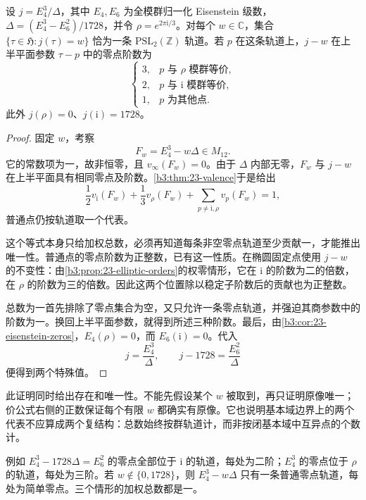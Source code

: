 \begin{theorem}\label{b3:thm:23-j-orbits}
设 \(j=E_4^3/\Delta\)，其中 \(E_4,E_6\) 为全模群归一化 Eisenstein 级数，\(\Delta=(E_4^3-E_6^2)/1728\)，并令 \(\rho=e^{2\pi\mathrm i/3}\)。对每个 \(w\in\mathbb C\)，集合
\(\{\tau\in\mathfrak H:j(\tau)=w\}\) 恰为一条 \(\mathrm{PSL}_2(\mathbb Z)\) 轨道。若 \(p\) 在这条轨道上，\(j-w\) 在上半平面参数 \(\tau-p\) 中的零点阶数为
\[
 \begin{cases}
 3,&p\text{ 与 }\rho\text{ 模群等价},\\
 2,&p\text{ 与 }\mathrm i\text{ 模群等价},\\
 1,&p\text{ 为其他点}.
 \end{cases}
\]
此外 \(j(\rho)=0\)、\(j(\mathrm i)=1728\)。
\end{theorem}
\begin{proof}
固定 \(w\)，考察
\[
 F_w=E_4^3-w\Delta\in M_{12}.
\]
它的常数项为一，故非恒零，且 \(v_\infty(F_w)=0\)。由于 \(\Delta\) 内部无零，\(F_w\) 与 \(j-w\) 在上半平面具有相同零点及阶数。\cref{b3:thm:23-valence}于是给出
\[
 \frac12v_{\mathrm i}(F_w)+\frac13v_\rho(F_w)
 +\sum_{p\ne\mathrm i,\rho}v_p(F_w)=1,
\]
普通点仍按轨道取一个代表。

这个等式本身只给加权总数，必须再知道每条非空零点轨道至少贡献一，才能推出唯一性。普通点的零点阶数为正整数，已有这一性质。在椭圆固定点使用 \(j-w\) 的不变性：由\cref{b3:prop:23-elliptic-orders}的权零情形，它在 \(\mathrm i\) 的阶数为二的倍数，在 \(\rho\) 的阶数为三的倍数。因此这两个位置除以稳定子阶数后的贡献也为正整数。

总数为一首先排除了零点集合为空，又只允许一条零点轨道，并强迫其商参数中的阶数为一。换回上半平面参数，就得到所述三种阶数。最后，由\cref{b3:cor:23-eisenstein-zeros}，\(E_4(\rho)=0\)，而 \(E_6(\mathrm i)=0\)。代入
\[
 j=\frac{E_4^3}{\Delta},\qquad
 j-1728=\frac{E_6^2}{\Delta}
\]
便得到两个特殊值。
\end{proof}

\ProseParagraphBreak
此证明同时给出存在和唯一性。不能先假设某个 \(w\) 被取到，再只证明原像唯一；价公式右侧的正数保证每个有限 \(w\) 都确实有原像。它也说明基本域边界上的两个代表不应算成两个复结构：总数始终按群轨道计，而非按闭基本域中互异点的个数计。

\ProseParagraphBreak
例如 \(E_4^3-1728\Delta=E_6^2\) 的零点全部位于 \(\mathrm i\) 的轨道，每处为二阶；\(E_4^3\) 的零点位于 \(\rho\) 的轨道，每处为三阶。若 \(w\notin\{0,1728\}\)，则 \(E_4^3-w\Delta\) 只有一条普通零点轨道，每处为简单零点。三个情形的加权总数都是一。

